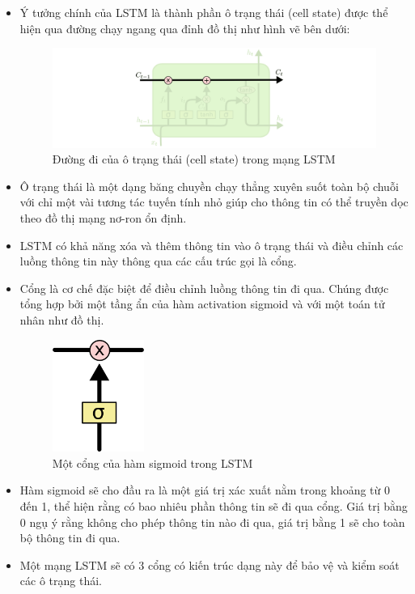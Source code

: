 \begin{itemize}
    \item Ý tưởng chính của LSTM là thành phần ô trạng thái (cell state) được thể hiện qua đường chạy ngang qua đỉnh đồ thị như hình vẽ bên dưới:
    \begin{figure}[H]
        \centering
        \includegraphics[width=14cm]{Images/Architecture/LSTM3-C-line.png}
    \caption{Đường đi của ô trạng thái (cell state) trong mạng LSTM}
    \end{figure}
    \item Ô trạng thái là một dạng băng chuyền chạy thẳng xuyên suốt toàn bộ chuỗi với chỉ một vài tương tác tuyến tính nhỏ giúp cho thông tin có thể truyền dọc theo đồ thị mạng nơ-ron ổn định.
    \item LSTM có khả năng xóa và thêm thông tin vào ô trạng thái và điều chỉnh các luồng thông tin này thông qua các cấu trúc gọi là cổng.
    \item Cổng là cơ chế đặc biệt để điều chỉnh luồng thông tin đi qua. Chúng được tổng hợp bởi một tầng ẩn của hàm activation sigmoid và với một toán tử nhân như đồ thị.
    \begin{figure}[H]
        \centering
        \includegraphics[width=3cm]{Images/Architecture/LSTM3-gate.png}
    \caption{Một cổng của hàm sigmoid trong LSTM}
    \end{figure}
    \item Hàm sigmoid sẽ cho đầu ra là một giá trị xác xuất nằm trong khoảng từ 0 đến 1, thể hiện rằng có bao nhiêu phần thông tin sẽ đi qua cổng. Giá trị bằng 0 ngụ ý rằng không cho phép thông tin nào đi qua, giá trị bằng 1 sẽ cho toàn bộ thông tin đi qua.
    \item Một mạng LSTM sẽ có 3 cổng có kiến trúc dạng này để bảo vệ và kiểm soát các ô trạng thái.
\end{itemize}

